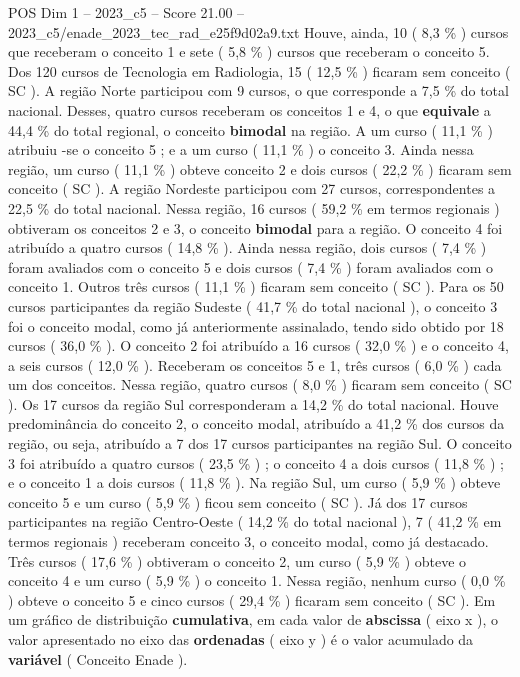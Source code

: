 \begin{textsample}{POS Dim 1 – 2023\_c5 – Score 21.00 – 2023\_c5/enade\_2023\_tec\_rad\_e25f9d02a9.txt}
Houve, ainda, 10 ( 8,3 \% ) cursos que receberam o conceito 1 e sete ( 5,8 \% ) cursos que receberam o conceito 5.
Dos 120 cursos de Tecnologia em Radiologia, 15 ( 12,5 \% ) ficaram sem conceito ( SC ).
A região Norte participou com 9 cursos, o que corresponde a 7,5 \% do total nacional.
Desses, quatro cursos receberam os conceitos 1 e 4, o que \textbf{equivale} a 44,4 \% do total regional, o conceito \textbf{bimodal} na região.
A um curso ( 11,1 \% ) atribuiu -se o conceito 5 ; e a um curso ( 11,1 \% ) o conceito 3.
Ainda nessa região, um curso ( 11,1 \% ) obteve conceito 2 e dois cursos ( 22,2 \% ) ficaram sem conceito ( SC ).
A região Nordeste participou com 27 cursos, correspondentes a 22,5 \% do total nacional.
Nessa região, 16 cursos ( 59,2 \% em termos regionais ) obtiveram os conceitos 2 e 3, o conceito \textbf{bimodal} para a região.
O conceito 4 foi atribuído a quatro cursos ( 14,8 \% ).
Ainda nessa região, dois cursos ( 7,4 \% ) foram avaliados com o conceito 5 e dois cursos ( 7,4 \% ) foram avaliados com o conceito 1.
Outros três cursos ( 11,1 \% ) ficaram sem conceito ( SC ).
Para os 50 cursos participantes da região Sudeste ( 41,7 \% do total nacional ), o conceito 3 foi o conceito modal, como já anteriormente assinalado, tendo sido obtido por 18 cursos ( 36,0 \% ).
O conceito 2 foi atribuído a 16 cursos ( 32,0 \% ) e o conceito 4, a seis cursos ( 12,0 \% ).
Receberam os conceitos 5 e 1, três cursos ( 6,0 \% ) cada um dos conceitos.
Nessa região, quatro cursos ( 8,0 \% ) ficaram sem conceito ( SC ).
Os 17 cursos da região Sul corresponderam a 14,2 \% do total nacional.
Houve predominância do conceito 2, o conceito modal, atribuído a 41,2 \% dos cursos da região, ou seja, atribuído a 7 dos 17 cursos participantes na região Sul.
O conceito 3 foi atribuído a quatro cursos ( 23,5 \% ) ; o conceito 4 a dois cursos ( 11,8 \% ) ; e o conceito 1 a dois cursos ( 11,8 \% ).
Na região Sul, um curso ( 5,9 \% ) obteve conceito 5 e um curso ( 5,9 \% ) ficou sem conceito ( SC ).
Já dos 17 cursos participantes na região Centro-Oeste ( 14,2 \% do total nacional ), 7 ( 41,2 \% em termos regionais ) receberam conceito 3, o conceito modal, como já destacado.
Três cursos ( 17,6 \% ) obtiveram o conceito 2, um curso ( 5,9 \% ) obteve o conceito 4 e um curso ( 5,9 \% ) o conceito 1.
Nessa região, nenhum curso ( 0,0 \% ) obteve o conceito 5 e cinco cursos ( 29,4 \% ) ficaram sem conceito ( SC ).
Em um gráfico de distribuição \textbf{cumulativa}, em cada valor de \textbf{abscissa} ( eixo x ), o valor apresentado no eixo das \textbf{ordenadas} ( eixo y ) é o valor acumulado da \textbf{variável} ( Conceito Enade ).

\end{textsample}
